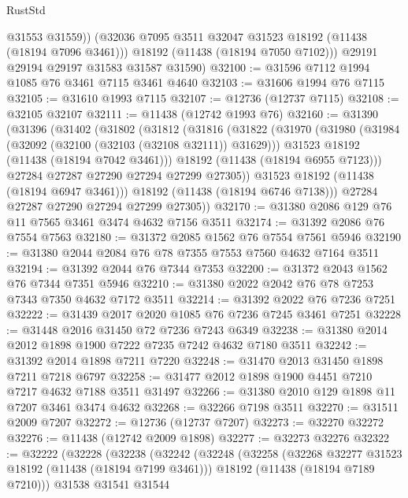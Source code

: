 \begin{lexlean}{RustStd}
\begin{coremodule}
            @31553
            @31559))
        (@32036 @7095 @3511 @32047 @31523 @18192 (@11438 (@18194 @7096 @3461)))
        @18192
        (@11438 (@18194 @7050 @7102)))
      @29191
      @29194
      @29197
      @31583
      @31587
      @31590)
@32100 := @31596 @7112 @1994 @1085 @76 @3461 @7115 @3461 @4640
@32103 := @31606 @1994 @76 @7115
@32105 := @31610 @1993 @7115
@32107 := @12736 (@12737 @7115)
@32108 := @32105 @32107
@32111 := @11438 (@12742 @1993 @76)
@32160 := @31390
    (@31396
      (@31402
        (@31802
          (@31812
            (@31816
              (@31822
                (@31970
                  (@31980
                    (@31984 (@32092 (@32100 (@32103 (@32108 @32111)) @31629)))
                    @31523
                    @18192
                    (@11438 (@18194 @7042 @3461)))
                  @18192
                  (@11438 (@18194 @6955 @7123)))
                @27284
                @27287
                @27290
                @27294
                @27299
                @27305))
            @31523
            @18192
            (@11438 (@18194 @6947 @3461)))
          @18192
          (@11438 (@18194 @6746 @7138)))
        @27284
        @27287
        @27290
        @27294
        @27299
        @27305))
@32170 := @31380 @2086 @129 @76 @11 @7565 @3461 @3474 @4632 @7156 @3511
@32174 := @31392 @2086 @76 @7554 @7563
@32180 := @31372 @2085 @1562 @76 @7554 @7561 @5946
@32190 := @31380 @2044 @2084 @76 @78 @7355 @7553 @7560 @4632 @7164 @3511
@32194 := @31392 @2044 @76 @7344 @7353
@32200 := @31372 @2043 @1562 @76 @7344 @7351 @5946
@32210 := @31380 @2022 @2042 @76 @78 @7253 @7343 @7350 @4632 @7172 @3511
@32214 := @31392 @2022 @76 @7236 @7251
@32222 := @31439 @2017 @2020 @1085 @76 @7236 @7245 @3461 @7251
@32228 := @31448 @2016 @31450 @72 @7236 @7243 @6349
@32238 := @31380 @2014 @2012 @1898 @1900 @7222 @7235 @7242 @4632 @7180 @3511
@32242 := @31392 @2014 @1898 @7211 @7220
@32248 := @31470 @2013 @31450 @1898 @7211 @7218 @6797
@32258 := @31477 @2012 @1898 @1900 @4451 @7210 @7217 @4632 @7188 @3511 @31497
@32266 := @31380 @2010 @129 @1898 @11 @7207 @3461 @3474 @4632
@32268 := @32266 @7198 @3511
@32270 := @31511 @2009 @7207
@32272 := @12736 (@12737 @7207)
@32273 := @32270 @32272
@32276 := @11438 (@12742 @2009 @1898)
@32277 := @32273 @32276
@32322 := @32222
    (@32228
      (@32238
        (@32242
          (@32248
            (@32258
              (@32268 @32277 @31523 @18192 (@11438 (@18194 @7199 @3461)))
              @18192
              (@11438 (@18194 @7189 @7210)))
            @31538
            @31541
            @31544

\end{coremodule}
\end{lexlean}
